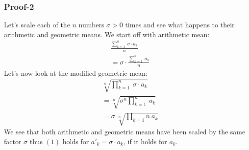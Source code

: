 \documentclass{article}
\begin{document}
\subsubsection*{Proof-2}
Let's scale each of the $n$ numbers $\sigma > 0$ times and see what happens to their arithmetic and geometric means. We start off with arithmetic mean:
\begin{equation*}
	\begin{aligned}
		&\frac{ \sum_{k=1}^{n}\ \sigma \cdot a_k }{n}\\
		&= \sigma \cdot \frac{\sum_{k=1}^n\ a_k}{n}
	\end{aligned}
\end{equation*}
Let's now look at the modified geometric mean:
\begin{equation*}
	\begin{aligned}
		&\sqrt[n]{ \prod_{k=1}^{n}\ \sigma \cdot a_k }\\
		&= \sqrt[n]{ \sigma^n \prod_{k=1}^{n}\ a_k }\\
		&= \sigma\ \sqrt[n]{ \prod_{k=1}{n}\ a_k }
	\end{aligned}
\end{equation*}
We see that both arithmetic and geometric means have been scaled by the same factor $\sigma$ thus $(1)$ holds for $a'_{k} = \sigma \cdot a_k$, if it holds for $a_k$.
\end{document}

